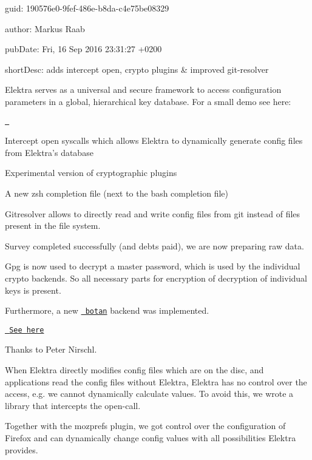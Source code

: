 
\begin{DoxyItemize}
\item guid\+: 190576e0-\/9fef-\/486e-\/b8da-\/c4e75be08329
\item author\+: Markus Raab
\item pub\+Date\+: Fri, 16 Sep 2016 23\+:31\+:27 +0200
\item short\+Desc\+: adds intercept open, crypto plugins \& improved git-\/resolver
\end{DoxyItemize}

Elektra serves as a universal and secure framework to access configuration parameters in a global, hierarchical key database. For a small demo see here\+:

\href{https://asciinema.org/a/cantr04assr4jkv8v34uz9b8r}{\texttt{ }}


\begin{DoxyItemize}
\item Intercept open syscalls which allows Elektra to dynamically generate config files from Elektra’s database
\item Experimental version of cryptographic plugins
\item A new zsh completion file (next to the bash completion file)
\item Gitresolver allows to directly read and write config files from git instead of files present in the file system.
\item Survey completed successfully (and debts paid), we are now preparing raw data.
\end{DoxyItemize}

Gpg is now used to decrypt a master password, which is used by the individual crypto backends. So all necessary parts for encryption of decryption of individual keys is present.

Furthermore, a new \href{https://botan.randombit.net}{\texttt{ botan}} backend was implemented.

\href{https://master.libelektra.org/src/plugins/crypto}{\texttt{ See here}}

Thanks to Peter Nirschl.

When Elektra directly modifies config files which are on the disc, and applications read the config files without Elektra, Elektra has no control over the access, e.\+g. we cannot dynamically calculate values. To avoid this, we wrote a library that intercepts the {\ttfamily open}-\/call.

Together with the {\ttfamily mozprefs} plugin, we got control over the configuration of Firefox and can dynamically change config values with all possibilities Elektra provides.

